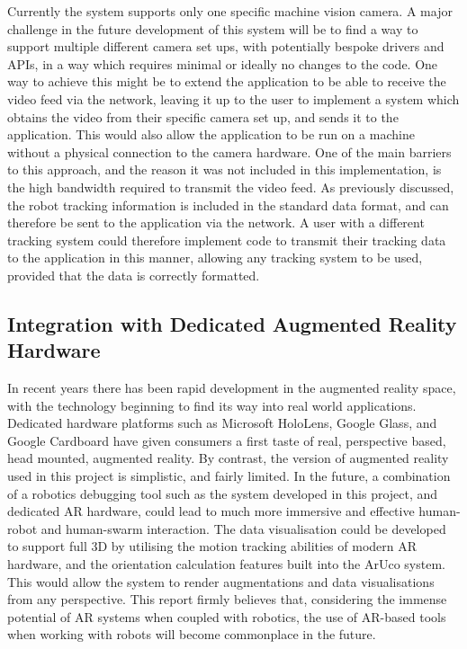 Currently the system supports only one specific machine vision camera. A major challenge in the future development of this system will be to find a way to support multiple different camera set ups, with potentially bespoke drivers and APIs, in a way which requires minimal or ideally no changes to the code. One way to achieve this might be to extend the application to be able to receive the video feed via the network, leaving it up to the user to implement a system which obtains the video from their specific camera set up, and sends it to the application. This would also allow the application to be run on a machine without a physical connection to the camera hardware. One of the main barriers to this approach, and the reason it was not included in this implementation, is the high bandwidth required to transmit the video feed. As previously discussed, the robot tracking information is included in the standard data format, and can therefore be sent to the application via the network. A user with a different tracking system could therefore implement code to transmit their tracking data to the application in this manner, allowing any tracking system to be used, provided that the data is correctly formatted.


\subsection{Integration with Dedicated Augmented Reality Hardware} \label{ARHardwareExtension}

In recent years there has been rapid development in the augmented reality space, with the technology beginning to find its way into real world applications. Dedicated hardware platforms such as Microsoft HoloLens, Google Glass, and Google Cardboard have given consumers a first taste of real, perspective based, head mounted, augmented reality. By contrast, the version of augmented reality used in this project is simplistic, and fairly limited. In the future, a combination of a robotics debugging tool such as the system developed in this project, and dedicated AR hardware, could lead to much more immersive and effective human-robot and human-swarm interaction. The data visualisation could be developed to support full 3D by utilising the motion tracking abilities of modern AR hardware, and the orientation calculation features built into the ArUco system. This would allow the system to render augmentations and data visualisations from any perspective. This report firmly believes that, considering the immense potential of AR systems when coupled with robotics, the use of AR-based tools when working with robots will become commonplace in the future.

